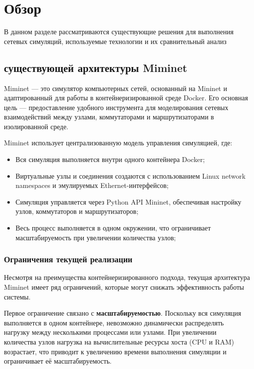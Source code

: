 
\section{Обзор}
\label{sec:relatedworks}

В данном разделе рассматриваются существующие решения для выполнения сетевых симуляций, используемые технологии и их сравнительный анализ

\subsection{существующей архитектуры Miminet}

Miminet — это симулятор компьютерных сетей, основанный на Mininet и адаптированный для работы в контейнеризированной среде Docker. Его основная цель — предоставление удобного инструмента для моделирования сетевых взаимодействий между узлами, коммутаторами и маршрутизаторами в изолированной среде.

Miminet использует централизованную модель управления симуляцией, где:
\begin{itemize}
    \item Вся симуляция выполняется внутри одного контейнера Docker;
    \item Виртуальные узлы и соединения создаются с использованием Linux network namespaces и эмулируемых Ethernet-интерфейсов;
    \item Симуляция управляется через Python API Mininet, обеспечивая настройку узлов, коммутаторов и маршрутизаторов;
    \item Весь процесс выполняется в одном окружении, что ограничивает масштабируемость при увеличении количества узлов;
\end{itemize}

\subsubsection{Ограничения текущей реализации}

Несмотря на преимущества контейнеризированного подхода, текущая архитектура Miminet имеет ряд ограничений, которые могут снижать эффективность работы системы.

Первое ограничение связано с \textbf{масштабируемостью}. Поскольку вся симуляция выполняется в одном контейнере, невозможно динамически распределять нагрузку между несколькими процессами или узлами. При увеличении количества узлов нагрузка на вычислительные ресурсы хоста (CPU и RAM) возрастает, что приводит к увеличению времени выполнения симуляции и ограничивает её масштабируемость.

